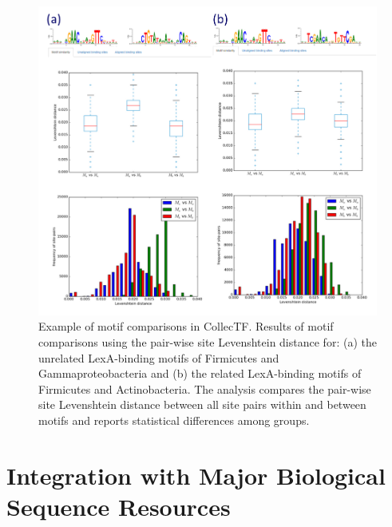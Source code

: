 \begin{figure}
  \centering
  \includegraphics[width=\textwidth]{figures/chapter2/motif-comparison}
  \caption{Example of motif comparisons in CollecTF\@. Results of motif
    comparisons using the pair-wise site Levenshtein distance for: (a) the
    unrelated LexA-binding motifs of Firmicutes and Gammaproteobacteria and (b)
    the related LexA-binding motifs of Firmicutes and Actinobacteria. The
    analysis compares the pair-wise site Levenshtein distance between all site
    pairs within and between motifs and reports statistical differences among
    groups.}
\label{fig:motif-comparison}
\end{figure}

\section{Integration with Major Biological Sequence Resources}

